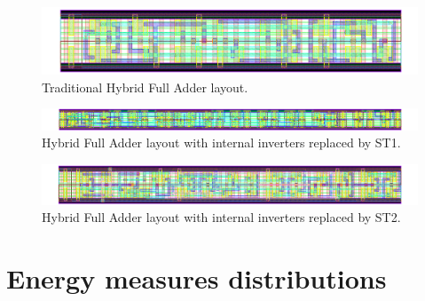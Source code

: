\documentclass[pgmicro,mestrado,english]{iiufrgs}
\begin{document}
\newpage


\begin{figure}[H]
\centering
\includegraphics[width=1.5\textwidth, angle =90]{HYBRID.png}
\caption{Traditional Hybrid Full Adder layout.}
\label{fig:HYBRID}
\end{figure}

\newpage 
\begin{figure}[H]
\centering
\includegraphics[width=1.5\textwidth, angle =90]{HYBRIDST1.png}
\caption{Hybrid Full Adder layout with internal inverters replaced by ST1.}
\label{fig:HYBRIDST1}
\end{figure}

\newpage 
\begin{figure}[H]
\centering
\includegraphics[width=1.5\textwidth, angle =90]{HYBRIDST2.png}
\caption{Hybrid Full Adder layout with internal inverters replaced by ST2.}
\label{fig:HYBRIDST2}
\end{figure}


\chapter{Energy measures distributions}

\addtolength{\oddsidemargin}{-.875in}
\addtolength{\evensidemargin}{-.875in}
\addtolength{\textwidth}{1.75in}
\end{document}

